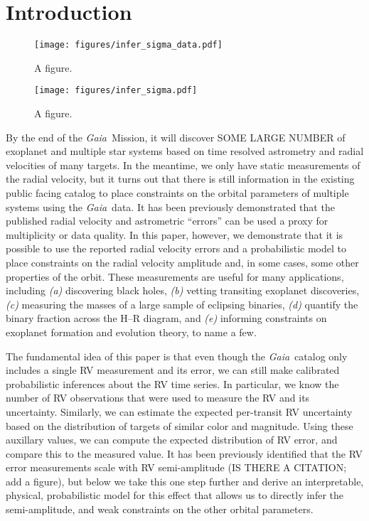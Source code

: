 \documentclass[modern, letterpaper]{aastex631}
\newcommand{\project}[1]{\textsl{#1}}
\newcommand{\Gaia}{\project{Gaia}}
\begin{document}

\section{Introduction} \label{sec:intro}

\begin{figure}
    \begin{centering}
        \texttt{[image: figures/infer\_sigma\_data.pdf]}
        \caption{A figure.}
        \label{fig:infer_sigma:data}
    \end{centering}
\end{figure}

\begin{figure}
    \begin{centering}
        \texttt{[image: figures/infer\_sigma.pdf]}
        \caption{A figure.}
        \label{fig:infer_sigma:results}
    \end{centering}
\end{figure}


By the end of the \Gaia\ Mission, it will discover SOME LARGE NUMBER of exoplanet and multiple star systems based on time resolved astrometry and radial velocities of many targets.
In the meantime, we only have static measurements of the radial velocity, but it turns out that there is still information in the existing public facing catalog to place constraints on the orbital parameters of multiple systems using the \Gaia\ data.
It has been previously demonstrated that the published radial velocity and astrometric ``errors'' can be used a proxy for multiplicity or data quality.
In this paper, however, we demonstrate that it is possible to use the reported radial velocity errors and a probabilistic model to place constraints on the radial velocity amplitude and, in some cases, some other properties of the orbit.
These measurements are useful for many applications, including \emph{(a)} discovering black holes, \emph{(b)} vetting transiting exoplanet discoveries, \emph{(c)} measuring the masses of a large sample of eclipsing binaries, \emph{(d)} quantify the binary fraction across the H--R diagram, and \emph{(e)} informing constraints on exoplanet formation and evolution theory, to name a few.

The fundamental idea of this paper is that even though the \Gaia\ catalog only includes a single RV measurement and its error, we can still make calibrated probabilistic inferences about the RV time series.
In particular, we know the number of RV observations that were used to measure the RV and its uncertainty.
Similarly, we can estimate the expected per-transit RV uncertainty based on the distribution of targets of similar color and magnitude.
Using these auxillary values, we can compute the expected distribution of RV error, and compare this to the measured value.
It has been previously identified that the RV error measurements scale with RV semi-amplitude (IS THERE A CITATION; add a figure), but below we take this one step further and derive an interpretable, physical, probabilistic model for this effect that allows us to directly infer the semi-amplitude, and weak constraints on the other orbital parameters.
\end{document}
